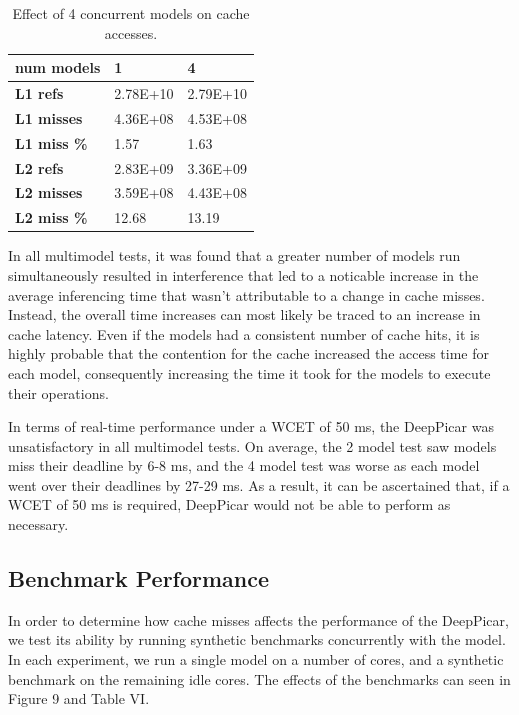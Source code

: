 \begin{table}[h]
\centering
  \begin{tabular} {| l | l | l |}
  \hline
  \textbf{num models} & 1 & 4 \\  \hline
  \textbf{L1 refs} & 2.78E+10 & 2.79E+10 \\ \hline
  \textbf{L1 misses} & 4.36E+08 & 4.53E+08 \\ \hline
  \textbf{L1 miss \%} & 1.57 & 1.63 \\ \hline
  \textbf{L2 refs} & 2.83E+09 & 3.36E+09 \\ \hline 
  \textbf{L2 misses} & 3.59E+08 & 4.43E+08 \\ \hline
  \textbf{L2 miss \%} & 12.68 & 13.19 \\ 
\hline
  \end{tabular}
  \caption{ Effect of 4 concurrent models on cache accesses. }
\end{table}

In all multimodel tests, it was found that a greater number of models run simultaneously resulted in 
interference that led to a noticable increase in the average inferencing time that wasn't 
attributable to a change in cache misses. Instead, the overall time increases can most likely be 
traced to an increase in cache latency. Even if the models had a consistent number of cache hits, it 
is highly probable that the contention for the cache increased the access time for each model, 
consequently increasing the time it took for the models to execute their operations.

In terms of real-time performance under a WCET of 50 ms, the DeepPicar was unsatisfactory in all 
multimodel tests. On average, the 2 model test saw models miss their deadline by 6-8 ms, and the 4 
model test was worse as each model went over their deadlines by 27-29 ms. As a result, it can be 
ascertained that, if a WCET of 50 ms is required, DeepPicar would not be able to perform as necessary.

\subsection{Benchmark Performance}
In order to determine how cache misses affects the performance of the DeepPicar, we test its ability by 
running synthetic benchmarks concurrently with the model. In each experiment, we run a single model on a 
number of cores, and a synthetic benchmark on the remaining idle cores. The effects of the benchmarks can
seen in Figure 9 and Table VI.

